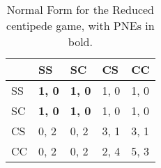 \begin{table}[h!]
  \centering
  \begin{tabular}{|l|l|l|l|l|}
    \hline
           &   SS          &  SC           &  CS  &   CC \\ \hline
       SS  & \textbf{1, 0} & \textbf{1, 0} & 1, 0 & 1, 0 \\ \hline
       SC  & \textbf{1, 0} & \textbf{1, 0} & 1, 0 & 1, 0 \\ \hline
       CS  & 0, 2          & 0, 2          & 3, 1 & 3, 1 \\ \hline
       CC  & 0, 2          & 0, 2          & 2, 4 & 5, 3 \\ \hline
  \end{tabular}
  \caption{Normal Form for the Reduced centipede game, with PNEs in bold.}
  \label{your-table-label}
\end{table}



